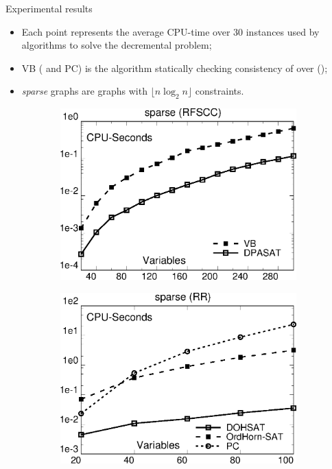 \begin{frame}{Experimental results}
    \begin{itemize}
        \item Each point represents the average CPU-time over 30 instances used by algorithms to solve the decremental problem;
        \item VB (\OHSATAlgorithmName{} and PC) is the \stateofart{} algorithm statically checking consistency of \TCSPName{} over \PAName{} (\OrdHornName{});
        \item \textit{sparse} graphs are graphs with $\lfloor n \log_2{n} \rfloor$ constraints.
    \end{itemize}

    \begin{figure}
        \centering
        \begin{subfigure}{0.49\textwidth}
            \centering
            \includegraphics[width=1.0\textwidth]{src/images/temporal-reasoning/dpasat}
        \end{subfigure}%
        \begin{subfigure}{0.49\textwidth}
            \centering
            \includegraphics[width=1.0\textwidth]{src/images/temporal-reasoning/dohsat}
        \end{subfigure}
    \end{figure}
\end{frame}